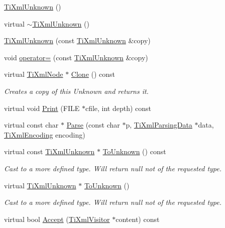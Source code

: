 \begin{DoxyCompactItemize}
\item 
\hyperlink{class_ti_xml_unknown_a945f09b3c6538099c69fc563216750c3}{Ti\-Xml\-Unknown} ()
\item 
virtual \hyperlink{class_ti_xml_unknown_ac21966c3b551553d760b4a339c9acda0}{$\sim$\-Ti\-Xml\-Unknown} ()
\item 
\hyperlink{class_ti_xml_unknown_abe798ff4feea31474850c7f0de6bdf5e}{Ti\-Xml\-Unknown} (const \hyperlink{class_ti_xml_unknown}{Ti\-Xml\-Unknown} \&copy)
\item 
void \hyperlink{class_ti_xml_unknown_a5097fe228cd5ad4edcdddf02c334fd83}{operator=} (const \hyperlink{class_ti_xml_unknown}{Ti\-Xml\-Unknown} \&copy)
\item 
virtual \hyperlink{class_ti_xml_node}{Ti\-Xml\-Node} $\ast$ \hyperlink{class_ti_xml_unknown_a675c4b2684af35e4c7649b7fd5ae598d}{Clone} () const 
\begin{DoxyCompactList}\small\item\em Creates a copy of this Unknown and returns it. \end{DoxyCompactList}\item 
virtual void \hyperlink{class_ti_xml_unknown_a025f19c21ef01ea9be50febb8fe0ba06}{Print} (F\-I\-L\-E $\ast$cfile, int depth) const 
\item 
virtual const char $\ast$ \hyperlink{class_ti_xml_unknown_aa51c2694e4177b5f0b5429ee5a81b58d}{Parse} (const char $\ast$p, \hyperlink{class_ti_xml_parsing_data}{Ti\-Xml\-Parsing\-Data} $\ast$data, \hyperlink{tinyxml_8h_a88d51847a13ee0f4b4d320d03d2c4d96}{Ti\-Xml\-Encoding} encoding)
\item 
virtual const \hyperlink{class_ti_xml_unknown}{Ti\-Xml\-Unknown} $\ast$ \hyperlink{class_ti_xml_unknown_ab0313e5fe77987d746ac1a97a254419d}{To\-Unknown} () const 
\begin{DoxyCompactList}\small\item\em Cast to a more defined type. Will return null not of the requested type. \end{DoxyCompactList}\item 
virtual \hyperlink{class_ti_xml_unknown}{Ti\-Xml\-Unknown} $\ast$ \hyperlink{class_ti_xml_unknown_a67c9fd22940e8c47f706a72cdd2e332c}{To\-Unknown} ()
\begin{DoxyCompactList}\small\item\em Cast to a more defined type. Will return null not of the requested type. \end{DoxyCompactList}\item 
virtual bool \hyperlink{class_ti_xml_unknown_a4e54d7482e05a837cf83c925cc683380}{Accept} (\hyperlink{class_ti_xml_visitor}{Ti\-Xml\-Visitor} $\ast$content) const 
\end{DoxyCompactItemize}
